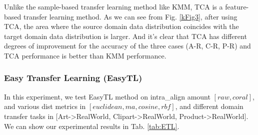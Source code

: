 \documentclass[conference]{IEEEtran}
\begin{document}
Unlike the sample-based transfer learning method like KMM, TCA is a
feature-based transfer learning method. As we can see from Fig. \ref{kFig3}, after using TCA, the area where the source domain data distribution coincides with the target domain data distribution is larger. And it's clear that TCA has different degrees of improvement for the accuracy of the three cases (A-R, C-R, P-R) and TCA performance is better than KMM performance.


\subsubsection{Easy Transfer Learning (EasyTL)}

In this experiment, we test EasyTL method on intra\_align amount $[raw, coral]$, and various dist metrics in $[euclidean,ma,cosine,rbf]$, and different domain transfer tasks in [Art->RealWorld, Clipart->RealWorld, Product->RealWorld]. We can show our experimental results in Tab. \ref{tab:ETL}. 
\end{document}
